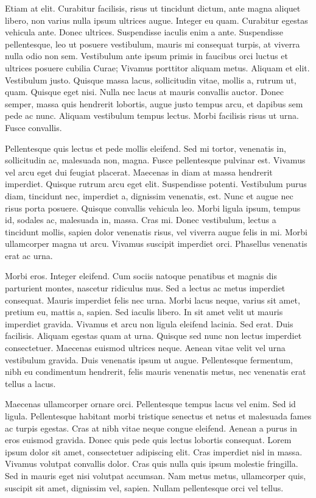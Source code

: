 \documentclass{book}
\begin{document}
Etiam at elit. Curabitur facilisis, risus ut tincidunt dictum, ante magna aliquet libero, non varius nulla ipsum ultrices augue. Integer eu quam. Curabitur egestas vehicula ante. Donec ultrices. Suspendisse iaculis enim a ante. Suspendisse pellentesque, leo ut posuere vestibulum, mauris mi consequat turpis, at viverra nulla odio non sem. Vestibulum ante ipsum primis in faucibus orci luctus et ultrices posuere cubilia Curae; Vivamus porttitor aliquam metus. Aliquam et elit. Vestibulum justo. Quisque massa lacus, sollicitudin vitae, mollis a, rutrum ut, quam. Quisque eget nisi. Nulla nec lacus at mauris convallis auctor. Donec semper, massa quis hendrerit lobortis, augue justo tempus arcu, et dapibus sem pede ac nunc. Aliquam vestibulum tempus lectus. Morbi facilisis risus ut urna. Fusce convallis.

Pellentesque quis lectus et pede mollis eleifend. Sed mi tortor, venenatis in, sollicitudin ac, malesuada non, magna. Fusce pellentesque pulvinar est. Vivamus vel arcu eget dui feugiat placerat. Maecenas in diam at massa hendrerit imperdiet. Quisque rutrum arcu eget elit. Suspendisse potenti. Vestibulum purus diam, tincidunt nec, imperdiet a, dignissim venenatis, est. Nunc et augue nec risus porta posuere. Quisque convallis vehicula leo. Morbi ligula ipsum, tempus id, sodales ac, malesuada in, massa. Cras mi. Donec vestibulum, lectus a tincidunt mollis, sapien dolor venenatis risus, vel viverra augue felis in mi. Morbi ullamcorper magna ut arcu. Vivamus suscipit imperdiet orci. Phasellus venenatis erat ac urna.

Morbi eros. Integer eleifend. Cum sociis natoque penatibus et magnis dis parturient montes, nascetur ridiculus mus. Sed a lectus ac metus imperdiet consequat. Mauris imperdiet felis nec urna. Morbi lacus neque, varius sit amet, pretium eu, mattis a, sapien. Sed iaculis libero. In sit amet velit ut mauris imperdiet gravida. Vivamus et arcu non ligula eleifend lacinia. Sed erat. Duis facilisis. Aliquam egestas quam at urna. Quisque sed nunc non lectus imperdiet consectetuer. Maecenas euismod ultrices neque. Aenean vitae velit vel urna vestibulum gravida. Duis venenatis ipsum ut augue. Pellentesque fermentum, nibh eu condimentum hendrerit, felis mauris venenatis metus, nec venenatis erat tellus a lacus.

Maecenas ullamcorper ornare orci. Pellentesque tempus lacus vel enim. Sed id ligula. Pellentesque habitant morbi tristique senectus et netus et malesuada fames ac turpis egestas. Cras at nibh vitae neque congue eleifend. Aenean a purus in eros euismod gravida. Donec quis pede quis lectus lobortis consequat. Lorem ipsum dolor sit amet, consectetuer adipiscing elit. Cras imperdiet nisl in massa. Vivamus volutpat convallis dolor. Cras quis nulla quis ipsum molestie fringilla. Sed in mauris eget nisi volutpat accumsan. Nam metus metus, ullamcorper quis, suscipit sit amet, dignissim vel, sapien. Nullam pellentesque orci vel tellus.
\end{document}

